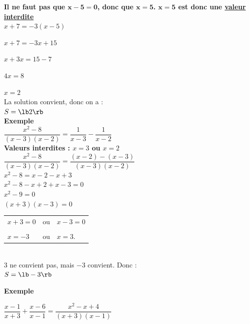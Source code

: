 \textbf{Il ne faut pas que $ \mathbf{x -5 = 0} $, donc que $ \mathbf{x = 5 }$. $ \mathbf{x = 5}$  est donc une \underline{valeur interdite} }
\\

$ x + 7 = -3\left(x-5\right) $

$ x + 7 = -3x +15 $

$ x + 3x = 15 - 7 $

$ 4x = 8 $

$ x = 2 $ \\

La solution convient, donc on a : \\

$ S = \lb 2 \rb $ \\

\textbf{Exemple } \\

$ \dfrac{x^2-8}{\left(x-3\right)\left(x-2\right)} = \dfrac{1}{x-3} - \dfrac{1}{x-2} $ \\

\textbf{Valeurs interdites : $ x = 3 $ ou $ x = 2 $} \\

$ \dfrac{x^2 - 8}{\left(x-3\right)\left(x-2\right)} = \dfrac{\left(x-2\right)-\left(x-3\right)}{\left(x-3\right)\left(x-2\right)} $ \\

$ x^2 - 8 = x-2-x+3 $\\

$ x^2 - 8 - x + 2 + x - 3 = 0 $\\

$ x^2 - 9 = 0 $ \\

$ \left(x+3\right)\left(x-3\right) = 0 $ \\

\begin{tabular}{lcl}
$ x + 3 = 0 $ & ou &$ x-3 = 0 $\\
&&\\
$ x= -3 $ & ou & $ x= 3 $. \\
\end{tabular}\\

$ 3 $ ne convient pas, mais $ -3$ convient. Donc : \\

$ S = \lb -3 \rb $

\newpage

\textbf{Exemple }

$ \dfrac{x-1}{x+3} + \dfrac{x-6}{x-1} = \dfrac{x^2-x+4}{\left(x+3\right)\left(x-1\right)} $ \\

